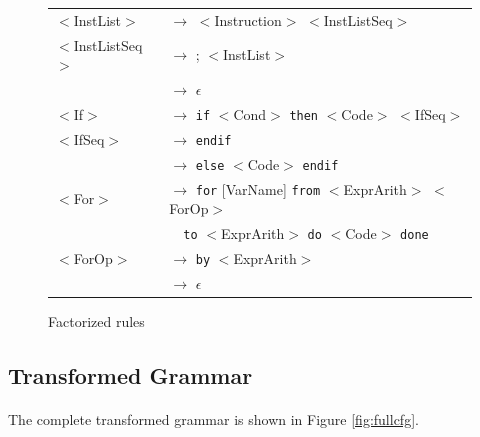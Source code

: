 \documentclass[letterpaper]{article}
\begin{document}
\begin{figure}[H]
    \centering
    \begin{tabular}{l l}
        $<$InstList$>$ & $\rightarrow$ $<$Instruction$>$ $<$InstListSeq$>$\\
        $<$InstListSeq$>$ & $\rightarrow$ ; $<$InstList$>$\\
         & $\rightarrow$ $\epsilon$\\

        $<$If$>$ & $\rightarrow$
        \texttt{if} $<$Cond$>$ \texttt{then} $<$Code$>$ $<$IfSeq$>$\\
        $<$IfSeq$>$ & $\rightarrow$ \texttt{endif}\\
         & $\rightarrow$
         \texttt{else} $<$Code$>$ \texttt{endif}\\

        $<$For$>$ & $\rightarrow$
        \texttt{for} [VarName] \texttt{from}
        $<$ExprArith$>$ $<$ForOp$>$ \\
        &$\quad$\texttt{to}
        $<$ExprArith$>$ \texttt{do} $<$Code$>$ \texttt{done}\\

        $<$ForOp$>$ & $\rightarrow$ \texttt{by} $<$ExprArith$>$\\
         & $\rightarrow$ $\epsilon$\\

    \end{tabular}
    \caption{Factorized rules}
    \label{fig:facto}
\end{figure}

\subsection{Transformed Grammar}

\paragraph{}

The complete transformed grammar is shown in Figure \ref{fig:fullcfg}.
\end{document}
